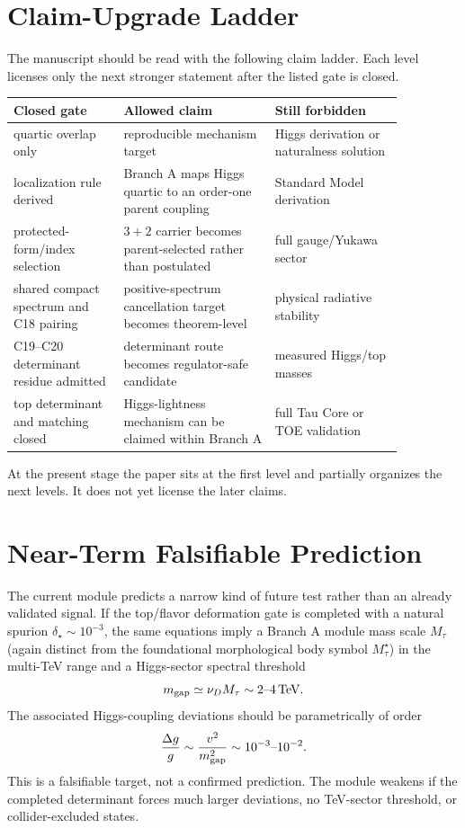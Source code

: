\documentclass[11pt]{article}
\begin{document}
\section{Claim-Upgrade Ladder}
The manuscript should be read with the following claim ladder.  Each level
licenses only the next stronger statement after the listed gate is closed.

\begin{center}
\begin{tabular}{p{0.24\linewidth}p{0.33\linewidth}p{0.29\linewidth}}
\toprule
\textbf{Closed gate} & \textbf{Allowed claim} & \textbf{Still forbidden}\\
\midrule
quartic overlap only & reproducible mechanism target & Higgs derivation or
naturalness solution\\
localization rule derived & Branch A maps Higgs quartic to an order-one parent
coupling & Standard Model derivation\\
protected-form/index selection & $3+2$ carrier becomes parent-selected rather
than postulated & full gauge/Yukawa sector\\
shared compact spectrum and C18 pairing & positive-spectrum cancellation target
becomes theorem-level & physical radiative stability\\
C19--C20 determinant residue admitted & determinant route becomes regulator-safe
candidate & measured Higgs/top masses\\
top determinant and matching closed & Higgs-lightness mechanism can be claimed
within Branch A & full Tau Core or TOE validation\\
\bottomrule
\end{tabular}
\end{center}

At the present stage the paper sits at the first level and partially organizes
the next levels.  It does not yet license the later claims.

\section{Near-Term Falsifiable Prediction}
The current module predicts a narrow kind of future test rather than an already validated signal. If the top/flavor deformation gate is completed with a natural spurion $\delta_\star\sim10^{-3}$, the same equations imply a Branch A module mass scale $M_\tau$ (again distinct from the foundational morphological body symbol $M_\tau^\star$) in the multi-TeV range and a Higgs-sector spectral threshold
\begin{equation}
m_{\rm gap}\simeq\nu_D M_\tau \sim 2\text{--}4\,{\rm TeV}.
\end{equation}
The associated Higgs-coupling deviations should be parametrically of order
\begin{equation}
\frac{\Delta g}{g}\sim\frac{v^2}{m_{\rm gap}^{2}}\sim10^{-3}\text{--}10^{-2} .
\end{equation}
This is a falsifiable target, not a confirmed prediction. The module weakens if the completed determinant forces much larger deviations, no TeV-sector threshold, or collider-excluded states.
\end{document}
